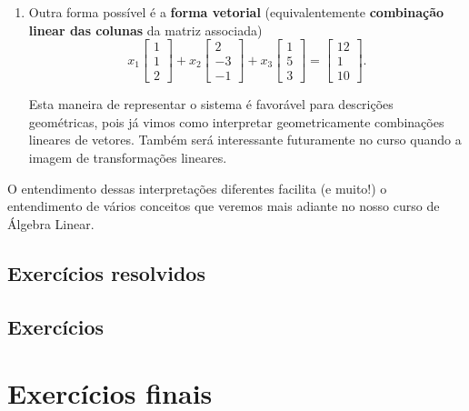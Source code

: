\begin{ex}
\begin{enumerate}[$(i)$]
\item Outra forma possível é a \textbf{forma vetorial} (equivalentemente \textbf{combinação linear das colunas} da matriz associada)
\begin{equation}
x_1
\left[
\begin{array}{c}
1   \\
1  \\
2 
\end{array}
\right] + x_2 
\left[
\begin{array}{c}
  2   \\
 -3   \\
 -1
\end{array}
\right] + x_3 
\left[
\begin{array}{c}
 1  \\
 5  \\
 3
\end{array}
\right] = 
\left[
\begin{array}{c}
12   \\
1  \\
10
\end{array}
\right].
\end{equation} 

Esta maneira de representar o sistema é favorável para descrições geométricas, pois já vimos como interpretar geometricamente combinações lineares de vetores. Também será interessante futuramente no curso quando a imagem de transformações lineares.
\end{enumerate}  O entendimento dessas interpretações diferentes facilita (e muito!) o entendimento de vários conceitos que veremos mais adiante no nosso curso de Álgebra Linear.
\end{ex}

\subsection*{Exercícios resolvidos}

\construirExeresol

\subsection*{Exercícios}

\construirExer

\section{Exercícios finais}

\construirExer

% 

